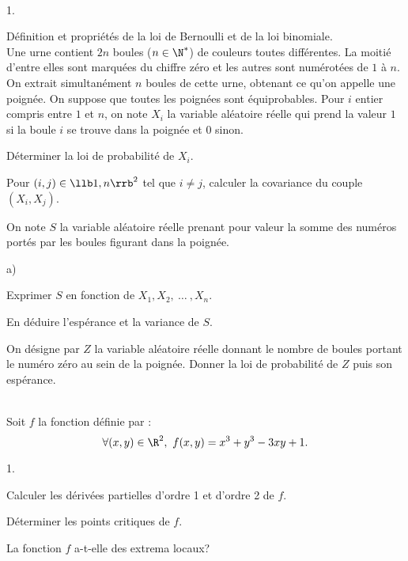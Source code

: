 \documentclass[11pt]{article}%
\begin{document}


\begin{exerciceAP}~
  \begin{noliste}{1.}
    \setlength{\itemsep}{2mm}
  \item Définition et propriétés de la loi de Bernoulli et de la loi
    binomiale.\\[.2cm]
    Une urne contient $2n$ boules ($n \in \N^*$) de couleurs
    toutes différentes. La moitié d'entre elles sont marquées du
    chiffre zéro et les autres sont numérotées de $1$ à $n$.\\
    On extrait simultanément $n$ boules de cette urne, obtenant ce
    qu'on appelle une poignée. On suppose que toutes les poignées sont
    équiprobables. Pour $i$ entier compris entre $1$ et $n$, on note
    $X_i$ la variable aléatoire réelle qui prend la valeur $1$ si la
    boule $i$ se trouve dans la poignée et $0$ sinon.
  \item Déterminer la loi de probabilité de $X_i$.
  \item Pour $(i,j) \in \llb 1 , n \rrb^2$ tel que $i \neq j$,
    calculer la covariance du couple $(X_i , X_j)$.
  \item On note $S$ la variable aléatoire réelle prenant pour valeur
    la somme des numéros portés par les boules figurant dans la
    poignée.
    \begin{noliste}{a)}
    \setlength{\itemsep}{2mm}
    \item Exprimer $S$ en fonction de $X_1 , X_2 ,\ \dots\ , X_n$.
    \item En déduire l'espérance et la variance de $S$.
    \end{noliste}
  \item On désigne par $Z$ la variable aléatoire réelle donnant le
    nombre de boules portant le numéro zéro au sein de la
    poignée. Donner la loi de probabilité de $Z$ puis son espérance.
  \end{noliste}
\end{exerciceAP}


\begin{exerciceSP}~\\
  Soit $f$ la fonction définie par :
  \[
 \forall (x ,y) \in \R^2,\ f(x,y) = x^3 + y^3 - 3 xy + 1.
\] \begin{noliste}{1.}
    \setlength{\itemsep}{2mm}
  \item Calculer les dérivées partielles d'ordre 1 et d'ordre 2 de $f$.
  \item Déterminer les points critiques de $f$.
  \item La fonction $f$ a-t-elle des extrema locaux?
  \end{noliste}
\end{exerciceSP}
\end{document}
